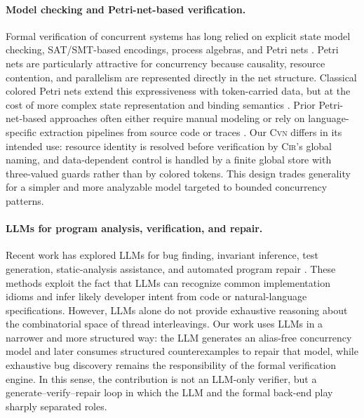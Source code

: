 \documentclass[sigconf]{acmart}
\begin{document}
\paragraph{Model checking and Petri-net-based verification.}
Formal verification of concurrent systems has long relied on explicit state model checking, SAT/SMT-based encodings, process algebras, and Petri nets \cite{Holzmann1997SPIN,Murata1989PetriNets,Esparza2008Unfoldings}. 
Petri nets are particularly attractive for concurrency because causality, resource contention, and parallelism are represented directly in the net structure. Classical colored Petri nets extend this expressiveness with token-carried data, but at the cost of more complex state representation and binding semantics \cite{Jensen2007CPNTools}. Prior Petri-net-based approaches often either require manual modeling or rely on language-specific extraction pipelines from source code or traces \cite{Esparza2002McMillan,Ball2002SLAM,Henzinger2003BLAST}. Our \textsc{Cvn} differs in its intended use: resource identity is resolved before verification by \textsc{Cir}'s global naming, and data-dependent control is handled by a finite global store with three-valued guards rather than by colored tokens. This design trades generality for a simpler and more analyzable model targeted to bounded concurrency patterns.

\paragraph{LLMs for program analysis, verification, and repair.}
Recent work has explored LLMs for bug finding, invariant inference, test generation, static-analysis assistance, and automated program repair \cite{Chen2021CodeLLMs,Fan2023RepairFromLLMs,Xia2023APRLLMs,Bouzenia2025RepairAgent,Li2025ContextAwarePrompting}. These methods exploit the fact that LLMs can recognize common implementation idioms and infer likely developer intent from code or natural-language specifications. However, LLMs alone do not provide exhaustive reasoning about the combinatorial space of thread interleavings. Our work uses LLMs in a narrower and more structured way: the LLM generates an alias-free concurrency model and later consumes structured counterexamples to repair that model, while exhaustive bug discovery remains the responsibility of the formal verification engine. In this sense, the contribution is not an LLM-only verifier, but a generate--verify--repair loop in which the LLM and the formal back-end play sharply separated roles.
\end{document}
